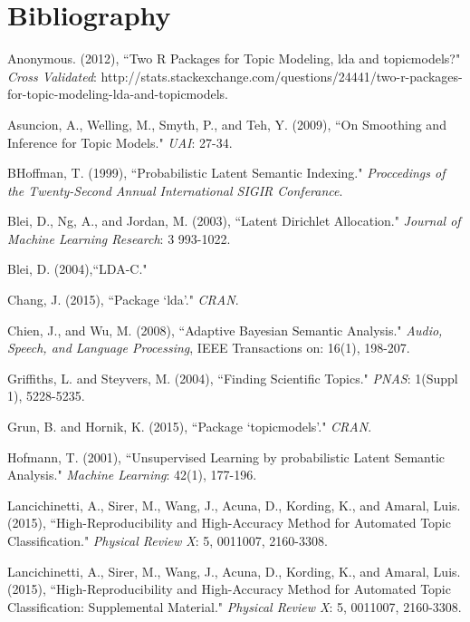 \documentclass[12pt]{article}
\begin{document}
\section{Bibliography}
\begin{thebibliography}{4}
		
	Anonymous. (2012),
	``Two R Packages for Topic Modeling, lda and topicmodels?" \textit{Cross Validated}: http://stats.stackexchange.com/questions/24441/two-r-packages-for-topic-modeling-lda-and-topicmodels.
	
	Asuncion, A., Welling, M., Smyth, P., and Teh, Y.  (2009),
	``On Smoothing and Inference for Topic Models." 
	\textit{UAI}: 27-34.
	
	BHoffman, T.  (1999),
	``Probabilistic Latent Semantic Indexing."
	\textit{Proccedings of the Twenty-Second Annual International SIGIR Conferance}.
		
	Blei, D., Ng, A., and Jordan, M.  (2003),
	``Latent Dirichlet Allocation."
	\textit{Journal of Machine Learning Research}: 3 993-1022.
	
	Blei, D. (2004),``LDA-C."
		
	Chang, J.  (2015),
	``Package `lda'."
	\textit{CRAN}.

	Chien, J., and Wu, M.  (2008),
	``Adaptive Bayesian Semantic Analysis."
	\textit{Audio, Speech, and Language Processing}, IEEE Transactions on: 16(1), 198-207.

	Griffiths, L. and Steyvers, M.  (2004),
	``Finding Scientific Topics."
	\textit{PNAS}: 1(Suppl 1), 5228-5235.

	Grun, B. and Hornik, K.  (2015),
	``Package `topicmodels'."
	\textit{CRAN}.
	
	Hofmann, T.  (2001),
	``Unsupervised Learning by probabilistic Latent Semantic Analysis."
	\textit{Machine Learning}: 42(1), 177-196.
	
	Lancichinetti, A., Sirer, M., Wang, J., Acuna, D., Kording, K., and Amaral, Luis. (2015),
	``High-Reproducibility and High-Accuracy Method for Automated Topic Classification."
	\textit{Physical Review X}: 5, 0011007, 2160-3308.
	
	Lancichinetti, A., Sirer, M., Wang, J., Acuna, D., Kording, K., and Amaral, Luis. (2015),
	``High-Reproducibility and High-Accuracy Method for Automated Topic Classification: Supplemental Material."
	\textit{Physical Review X}: 5, 0011007, 2160-3308.
	

\end{thebibliography}
\end{document}
